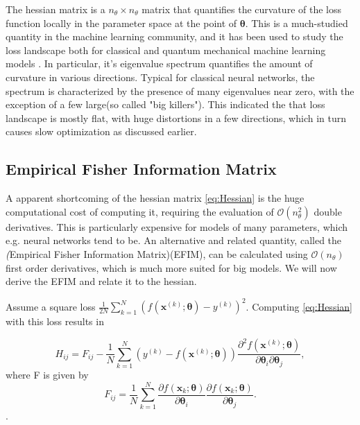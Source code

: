 The hessian matrix is a $n_\theta \times n_\theta$ matrix that quantifies the curvature of the loss function locally in the parameter space at the point of $\boldsymbol{\theta}$. This is a much-studied quantity in the machine learning community, and it has been used to study the loss landscape both for classical and quantum mechanical machine learning models \cite{LeCun2012} \cite{Huembeli_2021}. In particular, it's eigenvalue spectrum quantifies the amount of curvature in various directions. Typical for classical neural networks, the spectrum is characterized by the presence of many eigenvalues near zero, with the exception of a few large(so called "big killers"). This indicated the that loss landscape is mostly flat, with huge distortions in a few directions, which in turn causes slow optimization as discussed earlier. 

\subsection{Empirical Fisher Information Matrix}\label{sec:EFIM}
A apparent shortcoming of the hessian matrix \autoref{eq:Hessian} is the huge computational cost of computing it, requiring the evaluation of $\mathcal{O}(n_\theta^2)$ double derivatives. This is particularly expensive for models of many parameters, which e.g. neural networks tend to be. An alternative and related quantity, called the \emph(Empirical Fisher Information Matrix)(EFIM), can be calculated using $\mathcal{O}(n_\theta)$ first order derivatives, which is much more suited for big models. We will now derive the EFIM and relate it to the hessian.

Assume a square loss $\frac{1}{2N}\sum_{k=1}^{N} (f(\boldsymbol{x}^{(k)}; \boldsymbol{\theta}) - y^{(k)})^2$. Computing \autoref{eq:Hessian} with this loss results in 
    
\begin{equation}\label{eq:HessianSquareLoss}
    H_{ij} = F_{ij} -
    \frac{1}{N}\sum_{k=1}^{N} (y^{(k)} - f(\boldsymbol{x}^{(k)};\boldsymbol{\theta}))\frac{\partial^2 f(\boldsymbol{x}^{(k)};\boldsymbol{\theta})}{\partial \boldsymbol{\theta}_i\partial \boldsymbol{\theta}_j}, 
\end{equation}
where F is given by
\begin{equation}
\label{eq:EmpiricalFisher}
    F_{ij} =  \frac{1}{N}\sum_{k=1}^{N}
    \frac{\partial f(\boldsymbol{x}_k;\boldsymbol{\theta})}{\partial \boldsymbol{\theta}_i}
    \frac{\partial f(\boldsymbol{x}_k;\boldsymbol{\theta})}{\partial \boldsymbol{\theta}_j}.
\end{equation}.

